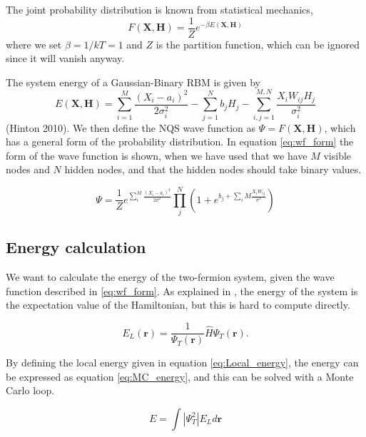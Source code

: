 \documentclass[norsk,a4paper,12pt]{article}
\begin{document}
The joint probability distribution is known from statistical mechanics,
\begin{equation}
\label{eq:F_rbm}
F(\boldsymbol{X},\boldsymbol{H})=\frac{1}{Z}e^{-\beta E(\boldsymbol{X},\boldsymbol{H})}
\end{equation}
where we set $\beta=1/kT=1$ and $Z$ is the partition function, which can be ignored since it will vanish anyway. 

The system energy of a Gaussian-Binary RBM is given by
\begin{equation}
E(\boldsymbol{X},\boldsymbol{H})=\sum_{i=1}^{M}\frac{(X_i-a_i)^2}{2\sigma_i^2}-\sum_{j=1}^Nb_jH_j-\sum_{i,j=1}^{M,N}\frac{X_iW_{ij}H_j}{\sigma_i^2}
\end{equation}
(Hinton 2010). We then define the NQS wave function as $\Psi = F(\boldsymbol{X},\boldsymbol{H})$, which has a general form of the probability distribution. In equation \ref{eq:wf_form} the form of the wave function is shown, when we have used that we have $M$ visible nodes and $N$ hidden nodes, and that the hidden nodes should take binary values. 

\begin{equation}
\label{eq:wf_form}
	\Psi = \frac{1}{Z} e^{\sum_i^M \frac{(X_i - a_i)^2}{2\sigma^2}} \prod_j^N (1+ e^{b_j + \sum_iM \frac{X_i W_{ij}}{\sigma^2}})
\end{equation}

\subsection{Energy calculation}
We want to calculate the energy of the two-fermion system, given the wave function described in \ref{eq:wf_form}. As explained in \cite{Nordhagen}, the energy of the system is the expectation value of the Hamiltonian, but this is hard to compute directly. 

\begin{equation}
E_L(\boldsymbol{r})=\frac{1}{\Psi_T(\boldsymbol{r})}\hat{H}\Psi_T(\boldsymbol{r}).
\label{eq:Local_energy}
\end{equation}

By defining the local energy given in equation \ref{eq:Local_energy}, the energy can be expressed as equation \ref{eq:MC_energy}, and this can be solved with a Monte Carlo loop.

\begin{equation}
\label{eq:MC_energy}
E = \int | \Psi_T^2| E_L d\boldsymbol{r}
\end{equation}
\end{document}
